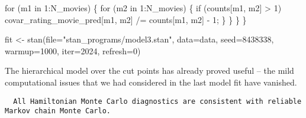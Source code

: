 \documentclass[
  letterpaper,
  DIV=11,
  numbers=noendperiod]{scrartcl}
\newenvironment{Shaded}{\begin{snugshade}}{\end{snugshade}}
\newcommand{\AttributeTok}[1]{\textcolor[rgb]{0.40,0.45,0.13}{#1}}
\newcommand{\ControlFlowTok}[1]{\textcolor[rgb]{0.00,0.23,0.31}{#1}}
\newcommand{\DecValTok}[1]{\textcolor[rgb]{0.68,0.00,0.00}{#1}}
\newcommand{\FunctionTok}[1]{\textcolor[rgb]{0.28,0.35,0.67}{#1}}
\newcommand{\NormalTok}[1]{\textcolor[rgb]{0.00,0.23,0.31}{#1}}
\newcommand{\OtherTok}[1]{\textcolor[rgb]{0.00,0.23,0.31}{#1}}
\newcommand{\SpecialCharTok}[1]{\textcolor[rgb]{0.37,0.37,0.37}{#1}}
\newcommand{\StringTok}[1]{\textcolor[rgb]{0.13,0.47,0.30}{#1}}
\begin{document}
\begin{codelisting}
\begin{Shaded}
\begin{Highlighting}[]
    \ControlFlowTok{for}\NormalTok{ (m1 }\ControlFlowTok{in} \DecValTok{1}\NormalTok{:N\_movies) \{}
      \ControlFlowTok{for}\NormalTok{ (m2 }\ControlFlowTok{in} \DecValTok{1}\NormalTok{:N\_movies) \{}
        \ControlFlowTok{if}\NormalTok{ (counts[m1, m2] \textgreater{} }\DecValTok{1}\NormalTok{)}
\NormalTok{          covar\_rating\_movie\_pred[m1, m2] /= counts[m1, m2] {-} }\DecValTok{1}\NormalTok{;}
\NormalTok{      \}}
\NormalTok{    \}}
\NormalTok{  \}}
\NormalTok{\}}
\end{Highlighting}
\end{Shaded}

\end{codelisting}

\begin{Shaded}
\begin{Highlighting}[]
\NormalTok{fit }\OtherTok{\textless{}{-}} \FunctionTok{stan}\NormalTok{(}\AttributeTok{file=}\StringTok{"stan\_programs/model3.stan"}\NormalTok{,}
            \AttributeTok{data=}\NormalTok{data, }\AttributeTok{seed=}\DecValTok{8438338}\NormalTok{,}
            \AttributeTok{warmup=}\DecValTok{1000}\NormalTok{, }\AttributeTok{iter=}\DecValTok{2024}\NormalTok{, }\AttributeTok{refresh=}\DecValTok{0}\NormalTok{)}
\end{Highlighting}
\end{Shaded}

The hierarchical model over the cut points has already proved useful --
the mild computational issues that we had considered in the last model
fit have vanished.

\begin{Shaded}
\end{Shaded}

\begin{verbatim}
  All Hamiltonian Monte Carlo diagnostics are consistent with reliable
Markov chain Monte Carlo.
\end{verbatim}
\end{document}
